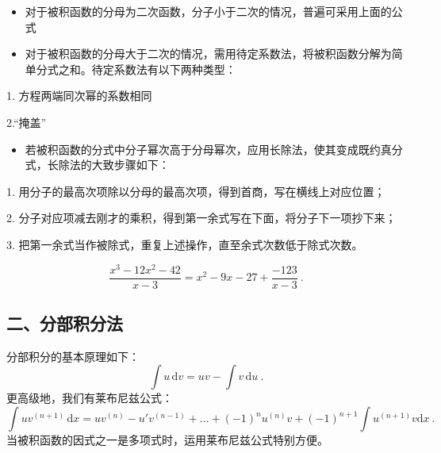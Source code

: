 \begin{itemize}
\item 对于被积函数的分母为二次函数，分子小于二次的情况，普遍可采用上面的公式
\end{itemize}
\begin{itemize}
\item 对于被积函数的分母大于二次的情况，需用待定系数法，将被积函数分解为简单分式之和。待定系数法有以下两种类型：
\end{itemize}
1. 方程两端同次幂的系数相同

2.“掩盖”

\begin{itemize}
\item 若被积函数的分式中分子幂次高于分母幂次，应用长除法，使其变成既约真分式，长除法的大致步骤如下：
\end{itemize}

1. 用分子的最高次项除以分母的最高次项，得到首商，写在横线上对应位置；

2. 分子对应项减去刚才的乘积，得到第一余式写在下面，将分子下一项抄下来；

3. 把第一余式当作被除式，重复上述操作，直至余式次数低于除式次数。
\begin{example}{}
$${\frac{x^3-12x^2-42}{x-3}=x^2-9x-27+\frac{-123}{x-3}}~.$$
\end{example}
\subsection{二、分部积分法}
分部积分的基本原理如下：
$$\int u\,\mathrm{d}v=uv-\int v\,\mathrm{d}u~.$$
更高级地，我们有莱布尼兹公式：
$$
\int uv^{(n+1)}\,\mathrm{d}x=uv^{(n)}-u'v^{(n-1)}+...+(-1)^nu^{(n)}v+(-1)^{n+1}\int u^{(n+1)}v\mathrm{d}x~.
$$
当被积函数的因式之一是多项式时，运用莱布尼兹公式特别方便。

